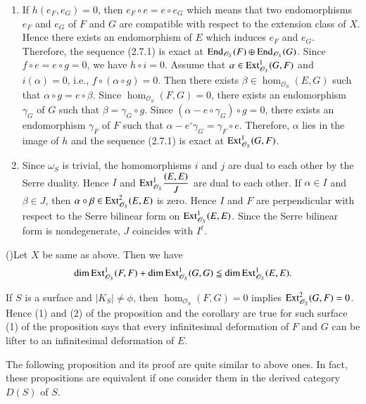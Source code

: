 \begin{Proof}
\begin{enumerate}
\item If $h(e_{F},e_{G})=0$, then $e_{F}\circ e=e\circ e_{G}$ which
means that two endomorphisms $e_F$ and $e_G$ of $F$ and $G$ are
compatible with respect to the extension class of $X$. Hence there
exists an endomorphism of $E$ which induces $e_F$ and
$e_G$. Therefore, the sequence (2.7.1) is exact at
$\mathrm{End}_{\mathscr{O}_S}(F)\oplus \mathrm{End}_{\mathscr{O}_S}(G)$. Since $f\circ
e=e\circ g=0$, we have $h\circ i=0$. Assume that
$\alpha\in \mathrm{Ext}^{1}_{\mathscr{O}_S}(G,F)$ and $i(\alpha)=0$, i.e.,
$f\circ(\alpha \circ g)=0$. Then there exists
$\beta \in \hom_{\mathscr{O}_S}(E,G)$ such that $\alpha\circ
g=e\circ \beta$. Since $\hom_{\mathscr{O}_S}(F,G)=0$, there exists an
endomorphism $\gamma_G$ of $G$ such that $\beta=\gamma_{G}\circ
g$. Since $(\alpha-e\circ \gamma_G)\circ g=0$, there exists an
endomorphism $\gamma_F$ of $F$ such that
$\alpha-e^{\circ}\gamma_G=\gamma_F\circ e$. Therefore, $\alpha$ lies
in the image of $h$ and the sequence (2.7.1) is exact at
$\mathrm{Ext}^{1}_{\mathscr{O}_S}(G,F)$.
 
\item Since $\omega_S$ is trivial, the homomorphisms $i$ and $j$ are
dual to each other by the Serre duality. Hence $I$ and
$\mathrm{Ext}^{1}_{\mathscr{O}_S}\dfrac{(E,E)}{J}$ are dual to each other. If
$\alpha \in I$ and $\beta \in J$, then
$\alpha\circ \beta \in \mathrm{Ext}^{2}_{\mathscr{O}_S}(E,E)$ is zero. Hence
$I$ and $F$ are perpendicular with respect to the Serre bilinear form
on $\mathrm{Ext}^{1}_{\mathscr{O}_S}(E,E)$. Since the Serre bilinear form is
nondegenerate, $J$ coincides with $I^{\ell}$.
\end{enumerate}
\enprf
\end{Proof}

\begin{cor}\label{cor2.8}
(\cite{key11})\pageoriginale Let $X$ be same as above. Then we have
$$
\dim \mathrm{Ext}^{1}_{\mathscr{O}_S}(F,F)+\dim\mathrm{Ext}^{1}_{\mathscr{O}_{S}}(G,G)\leqq \dim\mathrm{Ext}^{1}_{\mathscr{O}_S}(E,E).
$$  
\end{cor}

\begin{remark}\label{remark2.9}
If $S$ is a surface and $\mid K_S\mid \neq \phi$, then
$\hom_{\mathscr{O}_S}(F,G)=0$ implies
$\mathrm{Ext}^{2}_{\mathscr{O}_S}(G,F)=0$. Hence (1) and (2) of the
proposition and the corollary are true for such surface (1) of the
proposition says that every infinitesimal deformation of $F$ and $G$
can be lifter to an infinitesimal deformation of $E$. 

The following proposition and its proof are quite similar to above
ones. In fact, these propositions are equivalent if one consider them
in the derived category $D(S)$ of $S$. 
\end{remark}

